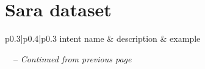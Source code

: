 \documentclass[bsc,frontabs,twoside,singlespacing,parskip,deptreport]{infthesis}
\begin{document}
\chapter{Sara dataset}{
  \label{chap:A-Sara}
  \begin{center}
    \begin{longtable}{p{}|p{}|p{}}
    \hline
    intent name & description & example \\ 
    \hline
    \endfirsthead
    
    \hline
    {\tablename\ \thetable\ -- \textit{Continued from previous page}} \\
    \hline
    \endhead

    \hline 
     \\
    \endfoot
    \endlastfoot


\end{longtable}
\end{center}}
\end{document}
